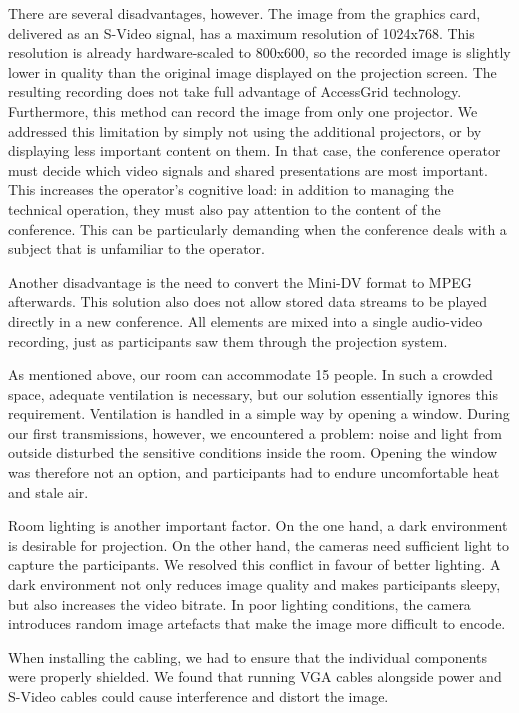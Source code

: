 There are several disadvantages, however. The image from the graphics card, delivered as an S-Video signal, has a maximum resolution of 1024x768. This resolution is already hardware-scaled to 800x600, so the recorded image is slightly lower in quality than the original image displayed on the projection screen.
The resulting recording does not take full advantage of AccessGrid technology. Furthermore, this method can record the image from only one projector. We addressed this limitation by simply not using the additional projectors, or by displaying less important content on them. In that case, the conference operator must decide which video signals and shared presentations are most important. This increases the operator's cognitive load: in addition to managing the technical operation, they must also pay attention to the content of the conference. This can be particularly demanding when the conference deals with a subject that is unfamiliar to the operator.

Another disadvantage is the need to convert the Mini-DV format to MPEG afterwards. This solution also does not allow stored data streams to be played directly in a new conference. All elements are mixed into a single audio-video recording, just as participants saw them through the projection system.

As mentioned above, our room can accommodate 15 people. In such a crowded space, adequate ventilation is necessary, but our solution essentially ignores this requirement. Ventilation is handled in a simple way by opening a window. During our first transmissions, however, we encountered a problem: noise and light from outside disturbed the sensitive conditions inside the room. Opening the window was therefore not an option, and participants had to endure uncomfortable heat and stale air.

Room lighting is another important factor. On the one hand, a dark environment is desirable for projection. On the other hand, the cameras need sufficient light to capture the participants. We resolved this conflict in favour of better lighting. A dark environment not only reduces image quality and makes participants sleepy, but also increases the video bitrate. In poor lighting conditions, the camera introduces random image artefacts that make the image more difficult to encode.

When installing the cabling, we had to ensure that the individual components were properly shielded. We found that running VGA cables alongside power and S-Video cables could cause interference and distort the image.
\proofed
